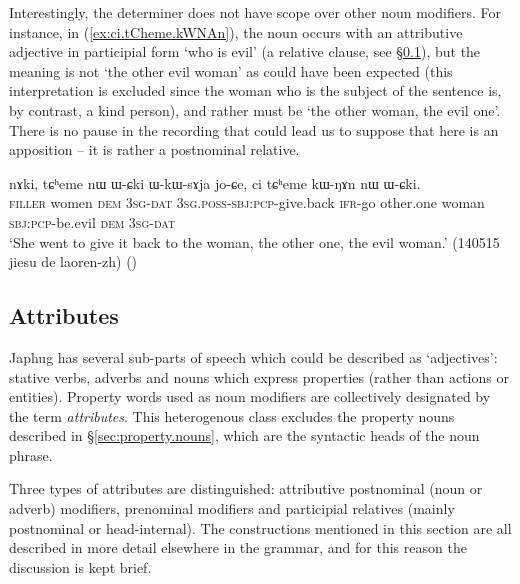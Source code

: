 Interestingly, the determiner  does not have scope over other noun modifiers. For instance, in (\ref{ex:ci.tCheme.kWNAn}), the noun  occurs with an attributive adjective in participial form  `who is evil' (a relative clause, see §\ref{sec:attributes}), but the meaning is not `the other evil woman' as could have been expected (this interpretation is excluded since the woman who is the subject of the sentence is, by contrast, a kind person), and rather must be `the other woman, the evil one'. There is no pause in the recording that could lead us to suppose that  here is an apposition -- it is rather a postnominal relative.

\begin{exe}
\ex \label{ex:ci.tCheme.kWNAn}
\gll nɤki, tɕʰeme nɯ ɯ-ɕki ɯ-kɯ-sɤja jo-ɕe, ci tɕʰeme kɯ-ŋɤn nɯ ɯ-ɕki. \\
\textsc{filler} women \textsc{dem} \textsc{3sg}-\textsc{dat} \textsc{3sg}.\textsc{poss}-\textsc{sbj}:\textsc{pcp}-give.back \textsc{ifr}-go other.one woman \textsc{sbj}:\textsc{pcp}-be.evil \textsc{dem} \textsc{3sg}-\textsc{dat} \\
\glt `She went to give it back to the woman, the other one, the evil woman.' (140515 jiesu de laoren-zh)
()
\end{exe}


\subsection{Attributes} \label{sec:attributes}
Japhug has several sub-parts of speech which could be described as `adjectives': stative verbs, adverbs and nouns which express properties (rather than actions or entities). Property words used as noun modifiers are collectively designated by the term \textit{attributes}. This heterogenous class excludes the property nouns described in §\ref{sec:property.nouns}, which are the syntactic heads of the noun phrase.

Three types of attributes are distinguished: attributive postnominal (noun or adverb) modifiers, prenominal modifiers and participial  relatives (mainly postnominal or head-internal). The constructions mentioned in this section are all described in more detail elsewhere in the grammar, and for this reason the discussion is kept brief.

